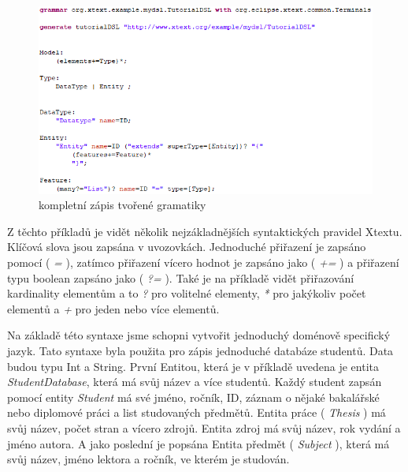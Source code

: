 \begin{figure}[H]
	\centering
	\includegraphics[width=\linewidth]{images/xtext/tutorial_xtext}
	\caption{kompletní zápis tvořené gramatiky}
\end{figure}

Z těchto příkladů je vidět několik nejzákladnějších syntaktických pravidel Xtextu. Klíčová slova jsou zapsána v uvozovkách. Jednoduché přiřazení je zapsáno pomocí ( \textit{=} ), zatímco přiřazení vícero hodnot je zapsáno jako ( \textit{+=} ) a přiřazení typu boolean zapsáno jako ( \textit{?=} ). Také je na příkladě vidět přiřazování kardinality elementům a to \textit{?} pro volitelné elementy, \textit{*} pro jakýkoliv počet elementů a \textit{+} pro jeden nebo více elementů.

Na základě této syntaxe jsme schopni vytvořit jednoduchý doménově specifický jazyk. Tato syntaxe byla použita pro zápis jednoduché databáze studentů. Data budou typu Int a String. První Entitou, která je v příkladě uvedena je entita \textit{StudentDatabase}, která má svůj název a více studentů. Každý student zapsán pomocí entity \textit{Student} má své jméno, ročník, ID, záznam o nějaké bakalářské nebo diplomové práci a list studovaných předmětů. Entita práce ( \textit{Thesis} ) má svůj název, počet stran a vícero zdrojů. Entita zdroj má svůj název, rok vydání a jméno autora. A jako poslední je popsána Entita předmět ( \textit{Subject} ), která má svůj název, jméno lektora a ročník, ve kterém je studován.

